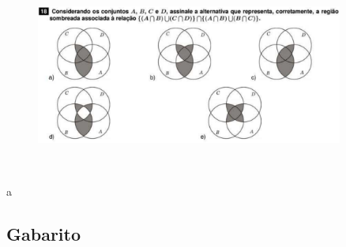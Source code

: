 \documentclass[a4paper, 12pt, addpoints]{exam}
\begin{document}
\begin{questions}
\question 

\begin{figure}
  \includegraphics[width=0.9\textwidth]{./Figs/poscomp18-cropped.pdf}
\end{figure}


\begin{resp}~


    a
\end{resp}


\end{questions}

\newpage

\newpage

\vspace{1cm}
\begin{center}
  \section*{Gabarito}
\end{center}
\end{document}
